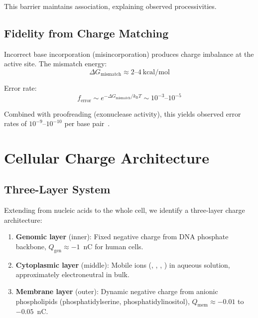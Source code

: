 \documentclass[twocolumn,aps,prb,superscriptaddress,longbibliography,floatfix]{revtex4-2}
\theoremstyle{remark}
\newcommand{\kB}{k_\text{B}}
\newcommand{\Qgen}{Q_\text{gen}}
\newcommand{\Qmem}{Q_\text{mem}}
\begin{document}
This barrier maintains association, explaining observed processivities.

\subsection{Fidelity from Charge Matching}

Incorrect base incorporation (misincorporation) produces charge
imbalance at the active site. The mismatch energy:
\begin{equation}
\Delta G_\text{mismatch} \approx 2\text{--}4~\text{kcal/mol}
\end{equation}

Error rate:
\begin{equation}
f_\text{error} \sim e^{-\Delta G_\text{mismatch}/\kB T} \sim 10^{-3}\text{--}10^{-5}
\end{equation}

Combined with proofreading (exonuclease activity), this yields observed
error rates of $10^{-9}$--$10^{-10}$ per base pair~\cite{Kunkel2004}.

\section{Cellular Charge Architecture}
\label{sec:cellular}

\subsection{Three-Layer System}

Extending from nucleic acids to the whole cell, we identify a
three-layer charge architecture:

\begin{enumerate}
    \item \textbf{Genomic layer} (inner): Fixed negative charge from DNA
    phosphate backbone, $\Qgen \approx -1$~nC for human cells.

    \item \textbf{Cytoplasmic layer} (middle): Mobile ions
    (, , , ) in aqueous solution,
    approximately electroneutral in bulk.

    \item \textbf{Membrane layer} (outer): Dynamic negative charge from
    anionic phospholipids (phosphatidylserine, phosphatidylinositol),
    $\Qmem \approx -0.01$ to $-0.05$~nC.
\end{enumerate}
\end{document}
